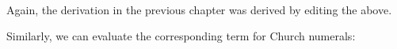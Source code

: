 \begin{fence}
\begin{code}
\AgdaSymbol{(}\AgdaSpace{}%
\AgdaSymbol{(}\AgdaSpace{}%
\AgdaSymbol{(}\AgdaSpace{}%
\AgdaSymbol{)))}\<%
\\
%
\>[3]\AgdaSymbol{)}\<%
\\
%
\>[3]\AgdaSymbol{(}\AgdaSpace{}%
\AgdaSymbol{(}\AgdaSpace{}%
\AgdaSymbol{(}\AgdaSpace{}%
\AgdaSymbol{(}\AgdaSpace{}%
\AgdaSymbol{(}\AgdaSpace{}%
\AgdaSymbol{)))))}\<%
\\
\>[0]\AgdaSymbol{\AgdaUnderscore{}}\AgdaSpace{}%
\AgdaSymbol{=}\AgdaSpace{}%
\<%
\end{code}
\end{fence}

Again, the derivation in the previous chapter was derived by editing the
above.

Similarly, we can evaluate the corresponding term for Church numerals:

